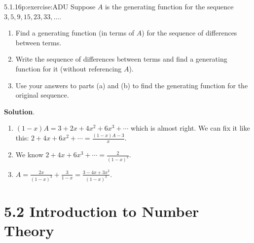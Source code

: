 \documentclass[twoside,11pt,]{book}
\newcommand{\blocktitlefont}{\relax}
\numberwithin{equation}{chapter}
\begin{document}
\begin{divisionsolution}{5.1.16}{}{p:exercise:ADU}%
Suppose \(A\) is the generating function for the sequence \(3, 5, 9, 15, 23, 33, \ldots\).%
\begin{enumerate}[label=(\alph*)]
\item{}Find a generating function (in terms of \(A\)) for the sequence of differences between terms.%
\item{}Write the sequence of differences between terms and find a generating function for it (without referencing \(A\)).%
\item{}Use your answers to parts (a) and (b) to find the generating function for the original sequence.%
\end{enumerate}
%
\par\smallskip%
\noindent\textbf{\blocktitlefont Solution}.\quad{}%
\begin{enumerate}[label=(\alph*)]
\item{}\((1-x)A = 3 + 2x + 4x^2 + 6x^3 + \cdots\) which is almost right. We can fix it like this: \(2 + 4x + 6x^2 + \cdots = \frac{(1-x)A - 3}{x}\).%
\item{}We know \(2 + 4x + 6x^3 + \cdots = \frac{2}{(1-x)^2}\).%
\item{}\(A = \frac{2x}{(1-x)^3} + \frac{3}{1-x} = \frac{3 -4x + 3x^2}{(1-x)^3}\).%
\end{enumerate}
%
\end{divisionsolution}%
\section*{5.2 Introduction to Number Theory}
\end{document}
